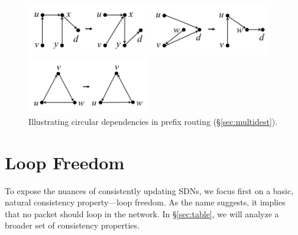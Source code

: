 
\begin{figure}
\begin{minipage}[b]{2.1in}
\centering
\includegraphics[width=2.1in]{figures/noloops.png}
\caption{Illustrating loop freedom (\S\ref{sec:loop-free}).}
\label{fig:example}
\end{minipage}
\hfill
\begin{minipage}[b]{2.1in}
\centering
\includegraphics[width=2.1in]{figures/nominimum.png}
\caption{Illustrating multiple minimal solutions (\S\ref{sec:minimal}).}
\label{fig:minimal}
\end{minipage}
\hfill
\begin{minipage}[b]{2.1in}
\centering
\includegraphics[width=2.1in]{figures/multidest.png}
\caption{Illustrating circular dependencies in prefix routing (\S\ref{sec:multidest}).}
\label{fig:multidest}
\end{minipage}
\end{figure}



\section{Loop Freedom}
\label{sec:loop-free}

To expose the nuances of consistently updating SDNs, we focus first on a basic, natural consistency property---loop freedom. As the name suggests, it implies that no packet should loop in the network.  In \S\ref{sec:table}, we will analyze a broader set of consistency properties.

